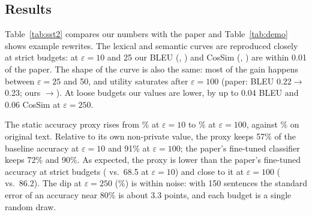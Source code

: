 \documentclass[11pt]{article}
\begin{document}
\begin{table}[t]
\centering
\small

\caption{Replication on SST-2 ($n=\NSST$). \textit{Paper}: DP-MLM results from \citet[Tables 1--2]{meisenbacher-etal-2024-dp-mlm}. $^\dagger$DeBERTaV3 fine-tuned on privatised training data, mean of 3 runs. $^\ddagger$Off-the-shelf DistilBERT SST-2 classifier on privatised validation sentences (static proxy). ``\% changed'': share of original words not kept (word alignment).}
\label{tab:sst2}
\end{table}

\begin{table}[t]
\centering
\small

\caption{DP-MLM rewrites of one sentence at each budget (single random draw from our notebook).}
\label{tab:demo}
\end{table}

\subsection{Results}
Table~\ref{tab:sst2} compares our numbers with the paper and Table~\ref{tab:demo} shows example rewrites. The lexical and semantic curves are reproduced closely at strict budgets: at $\varepsilon=10$ and 25 our BLEU (\SSTBleuTen, \SSTBleuTwentyFive) and CosSim (\SSTCosTen, \SSTCosTwentyFive) are within 0.01 of the paper. The shape of the curve is also the same: most of the gain happens between $\varepsilon=25$ and 50, and utility saturates after $\varepsilon=100$ (paper: BLEU 0.22$\rightarrow$0.23; ours \SSTBleuHundred$\rightarrow$\SSTBleuTwoFifty). At loose budgets our values are lower, by up to 0.04 BLEU and 0.06 CosSim at $\varepsilon=250$.

The static accuracy proxy rises from \SSTAccTen\% at $\varepsilon=10$ to \SSTAccHundred\% at $\varepsilon=100$, against \SSTAccOrig\% on original text. Relative to its own non-private value, the proxy keeps 57\% of the baseline accuracy at $\varepsilon=10$ and 91\% at $\varepsilon=100$; the paper's fine-tuned classifier keeps 72\% and 90\%. As expected, the proxy is lower than the paper's fine-tuned accuracy at strict budgets (\SSTAccTen{} vs.\ 68.5 at $\varepsilon=10$) and close to it at $\varepsilon=100$ (\SSTAccHundred{} vs.\ 86.2). The dip at $\varepsilon=250$ (\SSTAccTwoFifty\%) is within noise: with 150 sentences the standard error of an accuracy near 80\% is about 3.3 points, and each budget is a single random draw.
\end{document}
